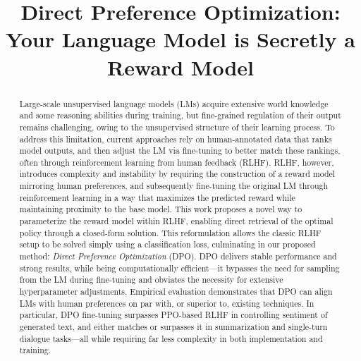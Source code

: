 \title{Direct Preference Optimization: Your Language Model is Secretly a Reward Model}

\begin{abstract}
Large-scale unsupervised language models (LMs) acquire extensive world knowledge and some reasoning abilities during training, but fine-grained regulation of their output remains challenging, owing to the unsupervised structure of their learning process. To address this limitation, current approaches rely on human-annotated data that ranks model outputs, and then adjust the LM via fine-tuning to better match these rankings, often through reinforcement learning from human feedback (RLHF). RLHF, however, introduces complexity and instability by requiring the construction of a reward model mirroring human preferences, and subsequently fine-tuning the original LM through reinforcement learning in a way that maximizes the predicted reward while maintaining proximity to the base model. This work proposes a novel way to parameterize the reward model within RLHF, enabling direct retrieval of the optimal policy through a closed-form solution. This reformulation allows the classic RLHF setup to be solved simply using a classification loss, culminating in our proposed method: \textit{Direct Preference Optimization} (DPO). DPO delivers stable performance and strong results, while being computationally efficient—it bypasses the need for sampling from the LM during fine-tuning and obviates the necessity for extensive hyperparameter adjustments. Empirical evaluation demonstrates that DPO can align LMs with human preferences on par with, or superior to, existing techniques. In particular, DPO fine-tuning surpasses PPO-based RLHF in controlling sentiment of generated text, and either matches or surpasses it in summarization and single-turn dialogue tasks—all while requiring far less complexity in both implementation and training.
\end{abstract}

